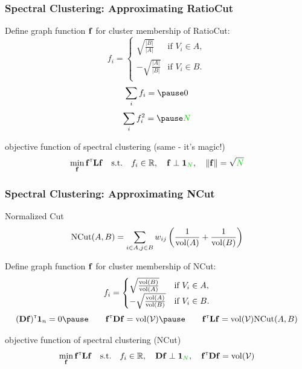 \documentclass{beamer}
\begin{document}
\begin{frame}
\frametitle{Spectral Clustering: Approximating RatioCut}
Define graph function $\mathbf{f}$ for cluster membership of RatioCut\pause : 
\[ f_i = 
\begin{cases}
\sqrt{\frac{|B|}{|A|}} & \mbox{if } V_i \in A, \\
- \sqrt{\frac{|A|}{|B|}} & \mbox{if } V_i \in B. \\ 
\end{cases} \]
 \pause
\[
\sum_{i}  f_i = \pause 0
\]
\[
\sum_{i}  f_i^2 = \pause \nodes
\]
\pause
\begin{block}{\centering objective function of spectral clustering (same - it's magic!)	}
\[
\min_{\bff} \bff\transpose \bL \bff \quad {\rm s.t.} 
\quad f_i \in \R,
\quad \bff \perp \bOne_\nodes, 
\quad \|\bff\| =  \sqrt{\nodes}
\]
\end{block}
\end{frame}
\begin{frame}
\frametitle{Spectral Clustering: Approximating NCut}
\begin{block}{Normalized Cut}
\[{\rm NCut}(A,B)= \sum_{i\in A, j\in B} w_{ij} \left( \frac{1}{{\rm vol}(A)} + \frac{1}{{\rm vol}(B)} \right) \]
\end{block}
\pause
Define graph function $\mathbf{f}$ for cluster membership of NCut: 
\[ f_i = 
\begin{cases}
\sqrt{\frac{{\rm vol}(B)}{{\rm vol}(A)}} & \mbox{if } V_i \in A, \\
- \sqrt{\frac{{\rm vol}(A)}{{\rm vol}(B)}} & \mbox{if } V_i \in B.
\end{cases} \]
 \pause \vspace{-1em}
\[
(\bD\bff)\transpose\bOne_n = 0 \pause \qquad  
\bff\transpose \bD \bff =  {\rm vol}(\nodeset) \pause \qquad  
\bff\transpose \bL \bff = {\rm vol}(\nodeset) {\rm NCut}(A,B)
\]
\pause \vspace{-1em}
\begin{block}{\centering objective function of spectral clustering (NCut)}
\[ 
\min_{\bff} \bff\transpose \bL \bff \quad {\rm s.t.} 
\quad f_i \in \R,
\quad \bD\bff \perp \bOne_\nodes, 
\quad \bff\transpose \bD \bff  = {\rm vol}(\nodeset)
\]
\end{block}
\end{frame}
\end{document}
